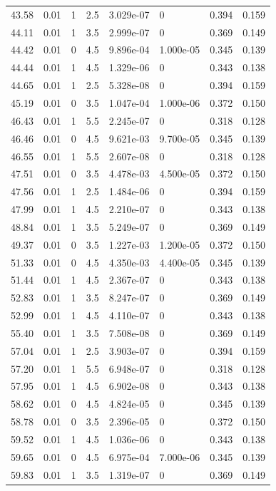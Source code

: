 \documentclass[preview]{standalone}
\begin{document}
{{{\begin{tabular}{L{1.2cm}C{1.2cm} C{0.3cm}C{0.5cm} C{1.4cm}C{1.4cm} C{1.4cm}C{1.4cm}}
  43.58  &  0.01  & 1     & 2.5 &  3.029e-07  & 0  & 0.394 &  0.159   \\ 
  44.11  &  0.01  & 1     & 3.5 &  2.999e-07  & 0  & 0.369 &  0.149   \\ 
  44.42  &  0.01  & 0     & 4.5 &  9.896e-04  & 1.000e-05  & 0.345 &  0.139   \\ 
  44.44  &  0.01  & 1     & 4.5 &  1.329e-06  & 0  & 0.343 &  0.138   \\ 
  44.65  &  0.01  & 1     & 2.5 &  5.328e-08  & 0  & 0.394 &  0.159   \\ 
  45.19  &  0.01  & 0     & 3.5 &  1.047e-04  & 1.000e-06  & 0.372 &  0.150   \\ 
  46.43  &  0.01  & 1     & 5.5 &  2.245e-07  & 0  & 0.318 &  0.128   \\ 
  46.46  &  0.01  & 0     & 4.5 &  9.621e-03  & 9.700e-05  & 0.345 &  0.139   \\ 
  46.55  &  0.01  & 1     & 5.5 &  2.607e-08  & 0  & 0.318 &  0.128   \\ 
  47.51  &  0.01  & 0     & 3.5 &  4.478e-03  & 4.500e-05  & 0.372 &  0.150   \\ 
  47.56  &  0.01  & 1     & 2.5 &  1.484e-06  & 0  & 0.394 &  0.159   \\ 
  47.99  &  0.01  & 1     & 4.5 &  2.210e-07  & 0  & 0.343 &  0.138   \\ 
  48.84  &  0.01  & 1     & 3.5 &  5.249e-07  & 0  & 0.369 &  0.149   \\ 
  49.37  &  0.01  & 0     & 3.5 &  1.227e-03  & 1.200e-05  & 0.372 &  0.150   \\ 
  51.33  &  0.01  & 0     & 4.5 &  4.350e-03  & 4.400e-05  & 0.345 &  0.139   \\ 
  51.44  &  0.01  & 1     & 4.5 &  2.367e-07  & 0  & 0.343 &  0.138   \\ 
  52.83  &  0.01  & 1     & 3.5 &  8.247e-07  & 0  & 0.369 &  0.149   \\ 
  52.99  &  0.01  & 1     & 4.5 &  4.110e-07  & 0  & 0.343 &  0.138   \\ 
  55.40  &  0.01  & 1     & 3.5 &  7.508e-08  & 0  & 0.369 &  0.149   \\ 
  57.04  &  0.01  & 1     & 2.5 &  3.903e-07  & 0  & 0.394 &  0.159   \\ 
  57.20  &  0.01  & 1     & 5.5 &  6.948e-07  & 0  & 0.318 &  0.128   \\ 
  57.95  &  0.01  & 1     & 4.5 &  6.902e-08  & 0  & 0.343 &  0.138   \\ 
  58.62  &  0.01  & 0     & 4.5 &  4.824e-05  & 0  & 0.345 &  0.139   \\ 
  58.78  &  0.01  & 0     & 3.5 &  2.396e-05  & 0  & 0.372 &  0.150   \\ 
  59.52  &  0.01  & 1     & 4.5 &  1.036e-06  & 0  & 0.343 &  0.138   \\ 
  59.65  &  0.01  & 0     & 4.5 &  6.975e-04  & 7.000e-06  & 0.345 &  0.139   \\ 
  59.83  &  0.01  & 1     & 3.5 &  1.319e-07  & 0  & 0.369 &  0.149   \\ 
\hline 
\end{tabular} 

}}}
\end{document}
